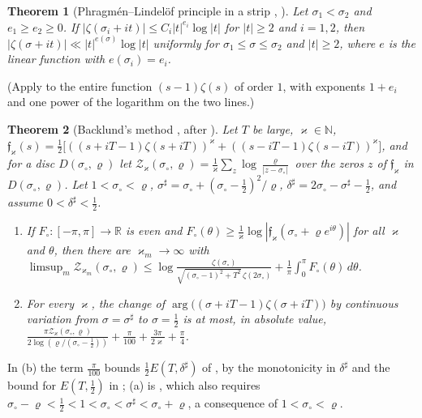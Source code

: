 \documentclass[preprint,12pt]{elsarticle}
\numberwithin{equation}{section}
\theoremstyle{plain}
\newtheorem{theorem}{Theorem}[section]
\theoremstyle{definition}
\theoremstyle{remark}
\newcommand{\R}{\mathbb R}
\begin{document}
\begin{theorem}[Phragm\'en--Lindel\"of principle in a strip {\cite[Lemma~2.5]{BellottiWong2025}}, {\cite[Lemma~3]{Trudgian2014}}]\label{thm:known_PL}
Let $\sigma_1<\sigma_2$ and $e_1\ge e_2\ge0$. If $|\zeta(\sigma_i+it)|\le C_i|t|^{e_i}\log|t|$ for $|t|\ge2$ and $i=1,2$, then $|\zeta(\sigma+it)|\ll|t|^{e(\sigma)}\log|t|$ uniformly for $\sigma_1\le\sigma\le\sigma_2$ and $|t|\ge2$, where $e$ is the linear function with $e(\sigma_i)=e_i$.
\end{theorem}
(Apply \cite[Lemma~2.5]{BellottiWong2025} to the entire function $(s-1)\zeta(s)$ of order $1$, with exponents $1+e_i$ and one power of the logarithm on the two lines.)

\begin{theorem}[Backlund's method {\cite[Lemmas~2.1, 2.3 and 2.4]{BellottiWong2025}}, after {\cite{Trudgian2014,HasanalizadeShenWong2022}}]\label{thm:known_backlund}
Let $T$ be large, $\varkappa\in\mathbb N$, $\mathfrak f_\varkappa(s)=\frac12\bigl[((s+iT-1)\zeta(s+iT))^\varkappa+((s-iT-1)\zeta(s-iT))^\varkappa\bigr]$, and for a disc $D(\sigma_\circ,\varrho)$ let $\mathcal Z_\varkappa(\sigma_\circ,\varrho)=\frac1\varkappa\sum_z\log\frac{\varrho}{|z-\sigma_\circ|}$ over the zeros $z$ of $\mathfrak f_\varkappa$ in $D(\sigma_\circ,\varrho)$. Let $1<\sigma_\circ<\varrho$, $\sigma^\sharp=\sigma_\circ+(\sigma_\circ-\frac12)^2/\varrho$, $\delta^\sharp=2\sigma_\circ-\sigma^\sharp-\frac12$, and assume $0<\delta^\sharp<\frac12$.
\begin{enumerate}[label=(\alph*),leftmargin=2em]
\item If $F_\circ:[-\pi,\pi]\to\R$ is even and $F_\circ(\theta)\ge\frac1\varkappa\log|\mathfrak f_\varkappa(\sigma_\circ+\varrho e^{i\theta})|$ for all $\varkappa$ and $\theta$, then there are $\varkappa_m\to\infty$ with $\limsup_m\mathcal Z_{\varkappa_m}(\sigma_\circ,\varrho)\le\log\frac{\zeta(\sigma_\circ)}{\sqrt{(\sigma_\circ-1)^2+T^2}\,\zeta(2\sigma_\circ)}+\frac1\pi\int_0^\pi F_\circ(\theta)\,d\theta$.
\item For every $\varkappa$, the change of $\arg\bigl((\sigma+iT-1)\zeta(\sigma+iT)\bigr)$ by continuous variation from $\sigma=\sigma^\sharp$ to $\sigma=\frac12$ is at most, in absolute value,
$\frac{\pi\mathcal Z_\varkappa(\sigma_\circ,\varrho)}{2\log(\varrho/(\sigma_\circ-\frac12))}+\frac{\pi}{100}+\frac{3\pi}{2\varkappa}+\frac\pi4$.
\end{enumerate}
\end{theorem}
In (b) the term $\frac\pi{100}$ bounds $\frac12E(T,\delta^\sharp)$ of \cite[Lemma~2.3]{BellottiWong2025}, by the monotonicity in $\delta^\sharp$ and the bound for $E(T,\frac12)$ in \cite[Lemma~2.4]{BellottiWong2025}; (a) is \cite[Lemma~2.1]{BellottiWong2025}, which also requires $\sigma_\circ-\varrho<\frac12<1<\sigma_\circ<\sigma^\sharp<\sigma_\circ+\varrho$, a consequence of $1<\sigma_\circ<\varrho$.
\end{document}
